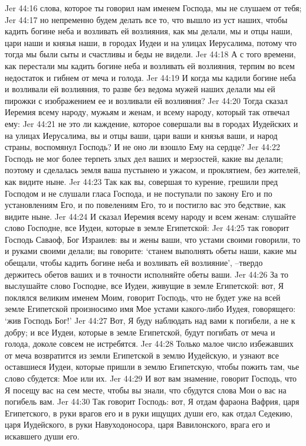 Jer 44:16  слова, которое ты говорил нам именем Господа, мы не слушаем от тебя;
Jer 44:17  но непременно будем делать все то, что вышло из уст наших, чтобы кадить богине неба и возливать ей возлияния, как мы делали, мы и отцы наши, цари наши и князья наши, в городах Иудеи и на улицах Иерусалима, потому что тогда мы были сыты и счастливы и беды не видели.
Jer 44:18  А с того времени, как перестали мы кадить богине неба и возливать ей возлияния, терпим во всем недостаток и гибнем от меча и голода.
Jer 44:19  И когда мы кадили богине неба и возливали ей возлияния, то разве без ведома мужей наших делали мы ей пирожки с изображением ее и возливали ей возлияния?
Jer 44:20  Тогда сказал Иеремия всему народу, мужьям и женам, и всему народу, который так отвечал ему:
Jer 44:21  не это ли каждение, которое совершали вы в городах Иудейских и на улицах Иерусалима, вы и отцы ваши, цари ваши и князья ваши, и народ страны, воспомянул Господь? И не оно ли взошло Ему на сердце?
Jer 44:22  Господь не мог более терпеть злых дел ваших и мерзостей, какие вы делали; поэтому и сделалась земля ваша пустынею и ужасом, и проклятием, без жителей, как видите ныне.
Jer 44:23  Так как вы, совершая то курение, грешили пред Господом и не слушали гласа Господа, и не поступали по закону Его и по установлениям Его, и по повелениям Его, то и постигло вас это бедствие, как видите ныне.
Jer 44:24  И сказал Иеремия всему народу и всем женам: слушайте слово Господне, все Иудеи, которые в земле Египетской:
Jer 44:25  так говорит Господь Саваоф, Бог Израилев: вы и жены ваши, что устами своими говорили, то и руками своими делали; вы говорите: `станем выполнять обеты наши, какие мы обещали, чтобы кадить богине неба и возливать ей возлияние', --твердо держитесь обетов ваших и в точности исполняйте обеты ваши.
Jer 44:26  За то выслушайте слово Господне, все Иудеи, живущие в земле Египетской: вот, Я поклялся великим именем Моим, говорит Господь, что не будет уже на всей земле Египетской произносимо имя Мое устами какого-либо Иудея, говорящего: `жив Господь Бог!'
Jer 44:27  Вот, Я буду наблюдать над вами к погибели, а не к добру; и все Иудеи, которые в земле Египетской, будут погибать от меча и голода, доколе совсем не истребятся.
Jer 44:28  Только малое число избежавших от меча возвратится из земли Египетской в землю Иудейскую, и узнают все оставшиеся Иудеи, которые пришли в землю Египетскую, чтобы пожить там, чье слово сбудется: Мое или их.
Jer 44:29  И вот вам знамение, говорит Господь, что Я посещу вас на сем месте, чтобы вы знали, что сбудутся слова Мои о вас на погибель вам.
Jer 44:30  Так говорит Господь: вот, Я отдам фараона Вафрия, царя Египетского, в руки врагов его и в руки ищущих души его, как отдал Седекию, царя Иудейского, в руки Навуходоносора, царя Вавилонского, врага его и искавшего души его.
